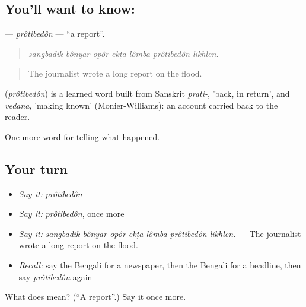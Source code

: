 \subsection*{You'll want to know: }
\textbf{} — \emph{prôtibedôn} — \textquotedblleft{}a report\textquotedblright{}.

\begin{quote}
      
\end{quote}

\begin{quote}
\emph{sāngbādik bônyār opôr ekṭā lômbā prôtibedôn likhlen.}
\end{quote}

\begin{quote}
The journalist wrote a long report on the flood.
\end{quote}

\begin{cousinweb}
\textbf{} (\emph{prôtibedôn}) is a learned word built from Sanskrit \emph{prati-}, 'back, in return', and \emph{vedana}, 'making known' (Monier-Williams): an account carried back to the reader.
\end{cousinweb}

\begin{grammarlens}[title={What you've built}]
One more word for telling what happened.
\end{grammarlens}

\subsection*{Your turn}
\begin{itemize}
\raggedright
  \item \emph{Say it:} \emph{prôtibedôn}
  \item \emph{Say it:} \emph{prôtibedôn}, once more
  \item \emph{Say it:} \emph{sāngbādik bônyār opôr ekṭā lômbā prôtibedôn likhlen.} — The journalist wrote a long report on the flood.
  \item \emph{Recall:} say the Bengali for a newspaper, then the Bengali for a headline, then say \emph{prôtibedôn} again
\end{itemize}

\begin{tcolorbox}[breakable,colback=teal!4,colframe=teal!35!black,title={Before you move on}]
What does  mean? (\textquotedblleft{}A report\textquotedblright{}.) Say it once more.
\end{tcolorbox}
